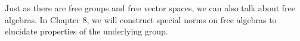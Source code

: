 Just as there are free groups and free vector spaces, we can also talk about free algebras. In Chapter 8, we will construct special norms on free algebras to elucidate properties of the underlying group.\newline

